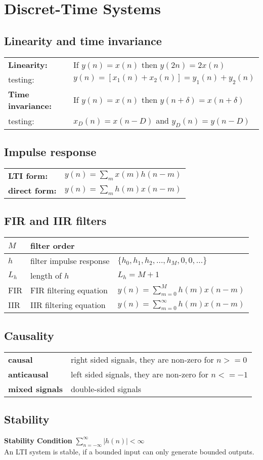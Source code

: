 \section{Discret-Time Systems}
\subsection{Linearity and time invariance}
\begin{tabular}{ll}
\textbf{Linearity:} & If $y(n) = x(n)$ then $y(2n)=2x(n)$\\
testing: & $y(n)=[x_1(n) + x_2(n)] = y_1(n) + y_2(n)$\\
\textbf{Time invariance:} & If $y(n) = x(n)$ then $y(n+\delta) = x(n+\delta)$\\
testing: & $x_D(n)=x(n-D)$ and $y_D(n)=y(n-D)$\\
\end{tabular}

\subsection{Impulse response}
\begin{tabular}{ll}
	\textbf{LTI form:}		& $y(n) = \sum\limits_m x(m)h(n-m)$ \\
	\textbf{direct form:}	& $y(n) = \sum\limits_m h(m)x(n-m)$
\end{tabular}


\subsection{FIR and IIR filters}
\begin{tabular}{|l|l|l|}
	\hline
	$M$	& filter order				& 
	\\ \hline
	$h$	& filter impulse response	& $\{ h_0, h_1, h_2, \ldots , h_M, 0, 0, \ldots\}$
	\\ \hline
	$L_h$	& length of $h$			& $L_h = M + 1$
	\\ \hline
	FIR		& FIR filtering equation	& $y(n) = \sum\limits_{m=0}^{M} h(m)x(n-m)$
	\\ \hline
	IIR		& IIR filtering equation	& $y(n) = \sum\limits_{m=0}^{\infty} h(m)x(n-m)$
	\\ \hline
\end{tabular}


\subsection{Causality}
\begin{tabular}{ll}
	\textbf{causal} & right sided signals, they are non-zero for $n>=0$ \\
	\textbf{anticausal} & left sided signals, they are non-zero for $n<=-1$ \\
	\textbf{mixed signals} & double-sided signals \\
\end{tabular}

\subsection{Stability}
\textbf{Stability Condition} $\sum\limits_{n=-\infty}^{\infty}\left| h(n)
\right| < \infty$\\
An LTI system is stable, if a bounded input can only generate bounded outputs.\\
